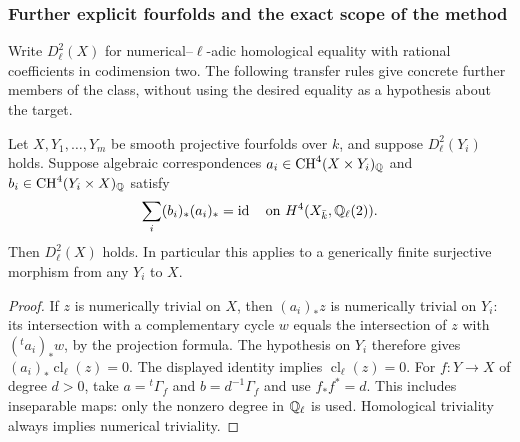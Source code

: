 \subsubsection{Further explicit fourfolds and the exact scope of the method}

Write $D^2_\ell(X)$ for numerical--$\ell$-adic homological equality
with rational coefficients in codimension two. The following transfer
rules give concrete further members of the class, without using the
desired equality as a hypothesis about the target.

\begin{proposition}
\label{B1b-correspondence}
Let $X,Y_1,\ldots,Y_m$ be smooth projective fourfolds over $k$, and
suppose $D^2_\ell(Y_i)$ holds. Suppose algebraic correspondences
$a_i\in\operatorname{CH}^4(X\times Y_i)_{\mathbb{Q}}$ and
$b_i\in\operatorname{CH}^4(Y_i\times X)_{\mathbb{Q}}$ satisfy
\[
 \sum_i(b_i)_*(a_i)_*=\operatorname{id}
       \quad\hbox{on }H^4(X_{\bar k},{\mathbb{Q}}_\ell(2)).
\]
Then $D^2_\ell(X)$ holds. In particular this applies to a generically
finite surjective morphism from any $Y_i$ to $X$.
\end{proposition}
\begin{proof}
If $z$ is numerically trivial on $X$, then $(a_i)_*z$ is numerically
trivial on $Y_i$: its intersection with a complementary cycle $w$
equals the intersection of $z$ with $({}^ta_i)_*w$, by the projection
formula. The hypothesis on $Y_i$ therefore gives
$(a_i)_*\operatorname{cl}_\ell(z)=0$. The displayed identity implies
$\operatorname{cl}_\ell(z)=0$. For $f:Y\to X$ of degree $d>0$, take
$a={}^t\Gamma_f$ and $b=d^{-1}\Gamma_f$ and use $f_*f^*=d$.
This includes inseparable maps: only the nonzero degree in ${\mathbb{Q}}_\ell$
is used. Homological triviality always implies numerical triviality.
\end{proof}

